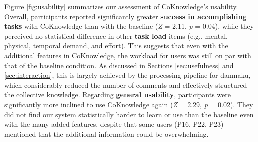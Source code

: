 Figure \ref{fig:usability} summarizes our assessment of CoKnowledge's usability. %
Overall, participants reported significantly greater \textbf{success in accomplishing tasks} with CoKnowledge than with the baseline (\textit{Z} = 2.11, \textit{p} = 0.04), while they perceived no statistical difference in other \textbf{task load} items (e.g., mental, physical, temporal demand, and effort). %
This suggests that even with the additional features in CoKnowledge, the workload for users was still on par with that of the baseline condition. As discussed in Sections \ref{sec:usefulness} and \ref{sec:interaction}, this is largely achieved by the processing pipeline for danmaku, which considerably reduced the number of comments and effectively structured the collective knowledge.
Regarding \textbf{general usability}, participants were significantly more inclined to use CoKnowledge again (\textit{Z} = 2.29, \textit{p} = 0.02). 
They did not find our system statistically harder to learn or use than the baseline even with the many added features, despite that some users (P16, P22, P23) mentioned that the additional information could be overwhelming.










